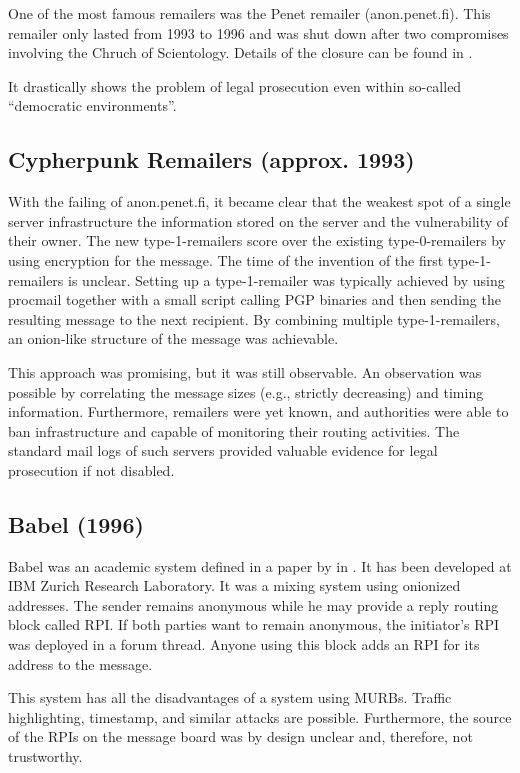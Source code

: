 One of the most famous remailers was the Penet remailer (anon.penet.fi). This remailer only lasted from 1993 to 1996 and was shut down after two compromises involving the Chruch of Scientology. Details of the closure can be found in \cite{penetClosure}.

It drastically shows the problem of legal prosecution even within so-called ``democratic environments''.

\subsection{Cypherpunk Remailers (approx. 1993)\label{sec:remCypherpunk}}
With the failing of anon.penet.fi, it became clear that the weakest spot of a single server infrastructure the information stored on the server and the vulnerability of their owner. The new type-1-remailers score over the existing type-0-remailers by using encryption for the message.  The time of the invention of the first type-1-remailers is unclear. Setting up a type-1-remailer was typically achieved by using procmail together with a small script calling PGP binaries and then sending the resulting message to the next recipient. By combining multiple type-1-remailers, an onion-like structure of the message was achievable. 

This approach was promising, but it was still observable. An observation was possible by correlating the message sizes (e.g., strictly decreasing) and timing information. Furthermore, remailers were yet known, and authorities were able to ban infrastructure and capable of monitoring their routing activities. The standard mail logs of such servers provided valuable evidence for legal prosecution if not disabled.

\subsection{Babel (1996)}
Babel was an academic system defined in a paper by \citeauthor{babel} in \citeyear{babel}\cite{babel}. It has been developed at IBM Zurich Research Laboratory. It was a mixing system using onionized addresses. The sender remains anonymous while he may provide a reply routing block called RPI. If both parties want to remain anonymous, the initiator's RPI was deployed in a forum thread. Anyone using this block adds an RPI for its address to the message.

This system has all the disadvantages of a system using MURBs. Traffic highlighting, timestamp, and similar attacks are possible. Furthermore, the source of the RPIs on the message board was by design unclear and, therefore, not trustworthy.

